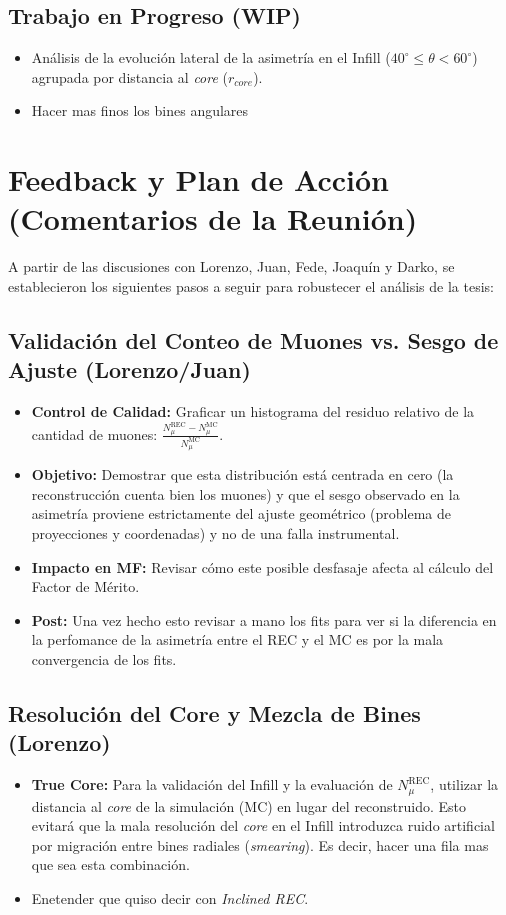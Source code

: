\subsection{Trabajo en Progreso (WIP)}
\begin{itemize}
	\item Análisis de la evolución lateral de la asimetría en el Infill ($40^\circ \le \theta < 60^\circ$) agrupada por distancia al \textit{core} ($r_{core}$).
	\item Hacer mas finos los bines angulares
\end{itemize}

\section{Feedback y Plan de Acción (Comentarios de la Reunión)}

A partir de las discusiones con Lorenzo, Juan, Fede, Joaquín y Darko, se establecieron los siguientes pasos a seguir para robustecer el análisis de la tesis:

\subsection{Validación del Conteo de Muones vs. Sesgo de Ajuste (Lorenzo/Juan)}
\begin{itemize}
	\item \textbf{Control de Calidad:} Graficar un histograma del residuo relativo de la cantidad de muones: $\frac{N_\mu^{\text{REC}} - N_\mu^{\text{MC}}}{N_\mu^{\text{MC}}}$.
	\item \textbf{Objetivo:} Demostrar que esta distribución está centrada en cero (la reconstrucción cuenta bien los muones) y que el sesgo observado en la asimetría proviene estrictamente del ajuste geométrico (problema de proyecciones y coordenadas) y no de una falla instrumental.
	\item \textbf{Impacto en MF:} Revisar cómo este posible desfasaje afecta al cálculo del Factor de Mérito.
	\item \textbf{Post:} Una vez hecho esto revisar a mano los fits para ver si la diferencia en la perfomance de la asimetría entre el REC y el MC es por la mala convergencia de los fits.
\end{itemize}

\subsection{Resolución del Core y Mezcla de Bines (Lorenzo)}
\begin{itemize}
	\item \textbf{True Core:} Para la validación del Infill y la evaluación de $N_\mu^{\text{REC}}$, utilizar la distancia al \textit{core} de la simulación (MC) en lugar del reconstruido. Esto evitará que la mala resolución del \textit{core} en el Infill introduzca ruido artificial por migración entre bines radiales (\textit{smearing}). Es decir, hacer una fila mas que sea esta combinación.
	\item Enetender que quiso decir con \textit{Inclined REC}.
\end{itemize}

